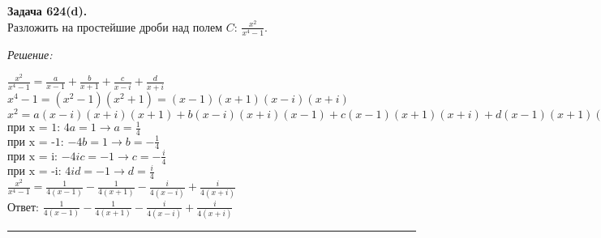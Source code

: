 \documentclass[a4paper, 12pt]{article}
\newenvironment{problem}[2][Задача]
    { \begin{mdframed}[backgroundcolor=gray!10] \textbf{#1 #2.} \\}
    {  \end{mdframed}}
\newenvironment{solution}
    {\textit{Решение: }}
    {\noindent\rule{7in}{1.5pt}}
\begin{document}
\begin{problem}{624(d)}
Разложить на простейшие дроби над полем $C$: $\frac{x^2}{x^4-1}$.
\end{problem}
\begin{solution}

$\displaystyle \frac{x^2}{x^4-1} = \frac{a}{x - 1} + \frac{b}{x + 1} + \frac{c}{x - i} + \frac{d}{x + i}$
\\
$\displaystyle x^4-1 = (x^2 - 1)(x^2 + 1) = (x - 1)(x + 1)(x - i)(x + i)$
\\
$\displaystyle x^2 = a(x - i)(x + i)(x + 1) + b(x - i)(x + i)(x - 1) + c(x - 1)(x + 1)(x + i) + d(x - 1)(x + 1)(x - i)$
\\
$\displaystyle\text{при x = 1: $4a = 1\rightarrow a = \frac{1}{4}$}$
\\
$\displaystyle\text{при x = -1: $-4b = 1\rightarrow b = -\frac{1}{4}$}$
\\
$\displaystyle\text{при x = i: $-4ic = -1\rightarrow c = -\frac{i}{4}$}$
\\
$\displaystyle\text{при x = -i: $4id = -1\rightarrow d = \frac{i}{4}$}$
\\
$\displaystyle \frac{x^2}{x^4-1} = \frac{1}{4(x - 1)} - \frac{1}{4(x + 1)} - \frac{i}{4(x - i)} + \frac{i}{4(x + i)}$
\\
Ответ: $\displaystyle \frac{1}{4(x - 1)} - \frac{1}{4(x + 1)} - \frac{i}{4(x - i)} + \frac{i}{4(x + i)}$

\end{solution}
\end{document}
